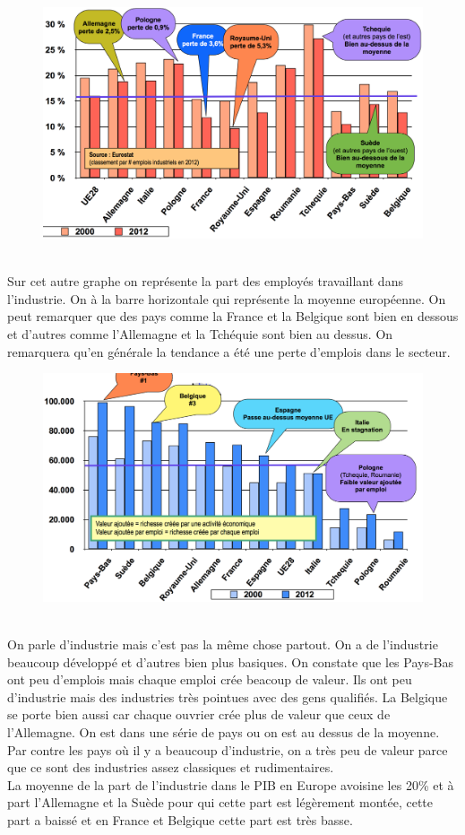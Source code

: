 \begin{figure}
	\includegraphics[scale=0.3]{67}
\end{figure}
\ \\
Sur cet autre graphe on représente la part des employés travaillant dans l'industrie. On à la barre horizontale qui représente la moyenne européenne. On peut remarquer que des pays comme la France et la Belgique sont bien en dessous et d'autres comme l'Allemagne et la Tchéquie sont bien au dessus. On remarquera qu'en générale la tendance a été une perte d'emplois dans le secteur. 

\begin{figure}
	\includegraphics[scale=0.29]{68}
\end{figure}
\ \\
On parle d’industrie mais c’est pas la même chose partout. On a de l’industrie beaucoup développé et d’autres bien plus basiques. On constate que les Pays-Bas ont peu d’emplois mais chaque emploi crée beacoup de valeur. Ils ont peu d’industrie mais des industries très pointues avec des gens qualifiés. La Belgique se porte bien aussi car chaque ouvrier crée plus de valeur que ceux de l’Allemagne. On est dans une série de pays ou on est au dessus de la moyenne. Par contre les pays où il y a beaucoup d’industrie, on a très peu de valeur parce que ce sont des industries assez classiques et rudimentaires. \\
La moyenne de la part de l'industrie dans le PIB en Europe avoisine les 20\% et à part l'Allemagne et la Suède pour qui cette part est légèrement montée, cette part a baissé et en France et Belgique cette part est très basse.

